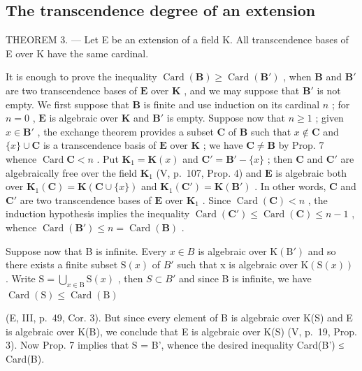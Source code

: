 \subsection{The transcendence degree of an extension}

THEOREM 3. --- Let E be an extension of a field K. All transcendence bases of E over K have the same cardinal.

It is enough to prove the inequality \(\operatorname{Card}(\mathbf{B}) \geqslant \operatorname{Card}(\mathbf{B}')\) , when \(\mathbf{B}\) and \(\mathbf{B}'\) are two transcendence bases of \(\mathbf{E}\) over \(\mathbf{K}\) , and we may suppose that \(\mathbf{B}'\) is not empty. We first suppose that \(\mathbf{B}\) is finite and use induction on its cardinal \(n\) ; for \(n = 0\) , \(\mathbf{E}\) is algebraic over \(\mathbf{K}\) and \(\mathbf{B}'\) is empty. Suppose now that \(n \geqslant 1\) ; given \(x \in \mathbf{B}'\) , the exchange theorem provides a subset \(\mathbf{C}\) of \(\mathbf{B}\) such that \(x \notin \mathbf{C}\) and \(\{x\} \cup \mathbf{C}\) is a transcendence basis of \(\mathbf{E}\) over \(\mathbf{K}\) ; we have \(\mathbf{C} \neq \mathbf{B}\) by Prop. 7 whence \(\operatorname{Card} \mathbf{C} < n\) . Put \(\mathbf{K}_1 = \mathbf{K}(x)\) and \(\mathbf{C}' = \mathbf{B}' - \{x\}\) ; then \(\mathbf{C}\) and \(\mathbf{C}'\) are algebraically free over the field \(\mathbf{K}_1\) (V, p.~107, Prop. 4) and \(\mathbf{E}\) is algebraic both over \(\mathbf{K}_1(\mathbf{C}) = \mathbf{K}(\mathbf{C} \cup \{x\})\) and \(\mathbf{K}_1(\mathbf{C}') = \mathbf{K}(\mathbf{B}')\) . In other words, \(\mathbf{C}\) and \(\mathbf{C}'\) are two transcendence bases of \(\mathbf{E}\) over \(\mathbf{K}_1\) . Since \(\operatorname{Card}(\mathbf{C}) < n\) , the induction hypothesis implies the inequality \(\operatorname{Card}(\mathbf{C}') \leqslant \operatorname{Card}(\mathbf{C}) \leqslant n - 1\) , whence \(\operatorname{Card}(\mathbf{B}') \leqslant n = \operatorname{Card}(\mathbf{B})\) .

Suppose now that B is infinite. Every \(x \in B\) is algebraic over \(\mathrm{K}(\mathrm{B}')\) and so there exists a finite subset \(\mathrm{S}(x)\) of \(B'\) such that x is algebraic over \(\mathrm{K}(\mathrm{S}(x))\) . Write \(\mathrm{S} = \bigcup_{x \in \mathrm{B}} \mathrm{S}(x)\) , then \(S \subset B'\) and since B is infinite, we have \(\operatorname{Card}(\mathrm{S}) \leqslant \operatorname{Card}(\mathrm{B})\)

(E, III, p.~49, Cor. 3). But since every element of B is algebraic over K(S) and E is algebraic over K(B), we conclude that E is algebraic over K(S) (V, p.~19, Prop. 3). Now Prop. 7 implies that S = B', whence the desired inequality Card(B') ≤ Card(B).

